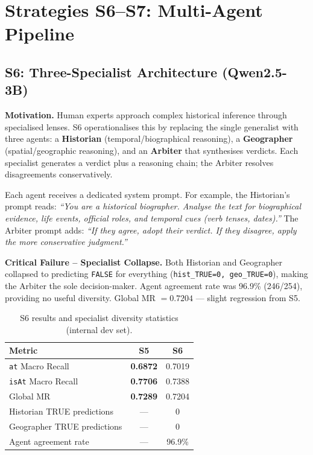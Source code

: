 \documentclass{ceurart}
\begin{document}
\section{Strategies S6--S7: Multi-Agent Pipeline}
\label{sec:s67}

\subsection{S6: Three-Specialist Architecture (Qwen2.5-3B)}

\textbf{Motivation.} Human experts approach complex historical inference through specialised lenses. S6 operationalises this by replacing the single generalist with three agents: a \textbf{Historian} (temporal/biographical reasoning), a \textbf{Geographer} (spatial/geographic reasoning), and an \textbf{Arbiter} that synthesises verdicts. Each specialist generates a verdict plus a reasoning chain; the Arbiter resolves disagreements conservatively.

Each agent receives a dedicated system prompt. For example, the Historian's prompt reads: \emph{``You are a historical biographer. Analyse the text for biographical evidence, life events, official roles, and temporal cues (verb tenses, dates).''} The Arbiter prompt adds: \emph{``If they agree, adopt their verdict. If they disagree, apply the more conservative judgment.''}

\textbf{Critical Failure -- Specialist Collapse.} Both Historian and Geographer collapsed to predicting \texttt{FALSE} for everything (\texttt{hist\_TRUE=0, geo\_TRUE=0}), making the Arbiter the sole decision-maker. Agent agreement rate was 96.9\% (246/254), providing no useful diversity. Global MR $= 0.7204$ --- slight regression from S5.

\begin{table}[ht]
  \caption{S6 results and specialist diversity statistics (internal dev set).}
  \label{tab:s6}
  \centering
  \begin{tabular}{lcc}
    \toprule
    \textbf{Metric} & \textbf{S5} & \textbf{S6} \\
    \midrule
    \texttt{at} Macro Recall & \textbf{0.6872} & 0.7019 \\
    \texttt{isAt} Macro Recall & \textbf{0.7706} & 0.7388 \\
    Global MR & \textbf{0.7289} & 0.7204 \\
    Historian TRUE predictions & --- & 0 \\
    Geographer TRUE predictions & --- & 0 \\
    Agent agreement rate & --- & 96.9\% \\
    \bottomrule
  \end{tabular}
\end{table}
\end{document}
